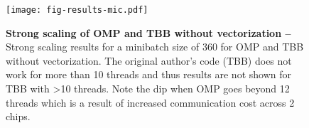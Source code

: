 
\begin{figure}[!hbt]

  \centering
  \texttt{[image: fig-results-mic.pdf]}

  \caption{\textbf{Strong scaling of OMP and TBB without vectorization --} Strong scaling results for a minibatch size of 360 for OMP and TBB without vectorization. The original author's code (TBB) does not work for more than 10 threads and thus results are not shown for TBB with >10 threads. Note the dip when OMP goes beyond 12 threads which is a result of increased communication cost across 2 chips.}

  \label{fig-results-mic}

\end{figure}
